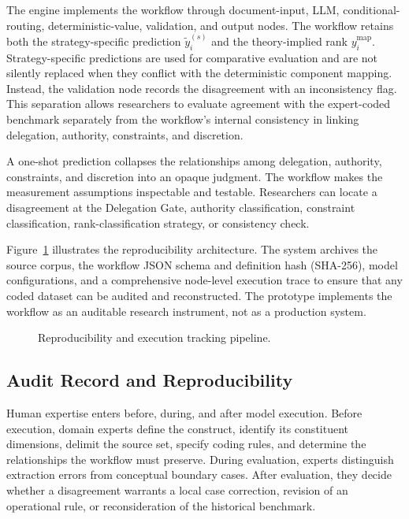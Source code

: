 \documentclass[runningheads]{llncs}
\begin{document}
 The engine implements the workflow through document-input, LLM, conditional-routing, deterministic-value, validation, and output nodes. The workflow retains both the strategy-specific prediction \(\tilde y_i^{(s)}\) and the theory-implied rank \(y_i^{\mathrm{map}}\). Strategy-specific predictions are used for comparative evaluation and are not silently replaced when they conflict with the deterministic component mapping. Instead, the validation node records the disagreement with an inconsistency flag. This separation allows researchers to evaluate agreement with the expert-coded benchmark separately from the workflow's internal consistency in linking delegation, authority, constraints, and discretion.

 A one-shot prediction collapses the relationships among delegation, authority, constraints, and discretion into an opaque judgment. The workflow makes the measurement assumptions inspectable and testable. Researchers can locate a disagreement at the Delegation Gate, authority classification, constraint classification, rank-classification strategy, or consistency check. 

Figure~\ref{fig:reproducibility} illustrates the reproducibility architecture. The system archives the source corpus, the workflow JSON schema and definition hash (SHA-256), model configurations, and a comprehensive node-level execution trace to ensure that any coded dataset can be audited and reconstructed. The prototype implements the workflow as an auditable research instrument, not as a production system.


\begin{figure}[t]
\centering
\resizebox{0.78\textwidth}{!}{}
\caption{Reproducibility and execution tracking pipeline.}
\label{fig:reproducibility}
\end{figure}
\vspace{-0.2 cm}
\subsection{Audit Record and Reproducibility}
\vspace{-0.2 cm}
Human expertise enters before, during, and after model execution. Before execution, domain experts define the construct, identify its constituent dimensions, delimit the source set, specify coding rules, and determine the relationships the workflow must preserve. During evaluation, experts distinguish extraction errors from conceptual boundary cases. After evaluation, they decide whether a disagreement warrants a local case correction, revision of an operational rule, or reconsideration of the historical benchmark.
\end{document}
